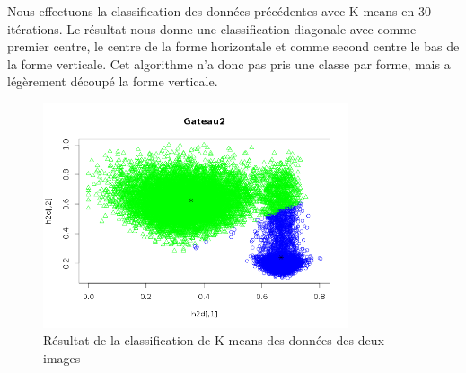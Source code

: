 \documentclass[a4paper,11pt]{article}
\begin{document}
  Nous effectuons la classification des données précédentes avec K-means en 30 itérations. Le résultat
  nous donne une classification diagonale avec comme premier centre, le centre de la forme horizontale et 
  comme second centre le bas de la forme verticale. Cet algorithme n'a donc pas pris une classe par forme,
  mais a légèrement découpé la forme verticale.
  
  \begin{figure}[H]
    \center
    \includegraphics[width=9cm]{resultat/classification_gateau.png}
    \caption{Résultat de la classification de K-means des données des deux images}
  \end{figure}
  
  
\end{document}
